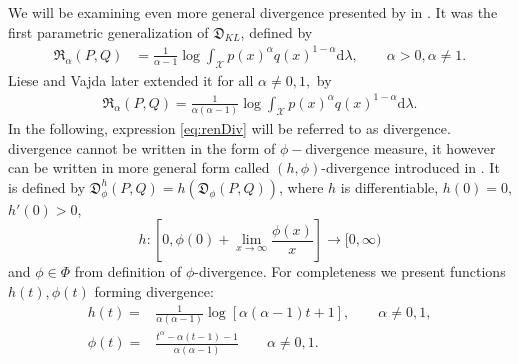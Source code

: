 We will be examining even more general divergence presented by \ren in \cite{Renyi1961}. It was the first parametric generalization of $\mathfrak{D}_{KL}$, defined by
\begin{align*}
\mathfrak{R}_\alpha(P,Q) & = \frac{1}{\alpha-1} \log\int_\mathcal{X} p(x)^\alpha q(x)^{1-\alpha}\mathrm{d}\lambda , \qquad \alpha >0, \alpha \neq 1.
\end{align*}
Liese and Vajda \cite{LieseVajda1987} later extended it for all $\alpha \neq 0,1,$ by
\begin{equation}
\begin{aligned}
\mathfrak{R}_\alpha(P,Q)  = \frac{1}{\alpha(\alpha-1)} \log\int_\mathcal{X} p(x)^\alpha q(x)^{1-\alpha}\mathrm{d}\lambda.%
\label{eq:renDiv}
\end{aligned}
\end{equation}
In the following, expression \eqref{eq:renDiv} will be referred to as \ren divergence.
\ren divergence cannot be written in the form of $\phi-$divergence measure, it however can be written in more general form called $(h,\phi)$-divergence introduced  in \cite{Menendez1995}. It is defined by  $\mathfrak{D}_\phi^h(P,Q) = h( \mathfrak{D}_{\phi}(P,Q))$, where  $h$ is differentiable, $h(0) = 0$, $h' (0) > 0 $,  \[h : \left[0,\phi(0) + \lim_{x\rightarrow \infty} \frac{\phi(x)}{x} \right] \rightarrow [0,\infty)\] and $\phi \in \Phi$ from definition of $\phi$-divergence. For completeness we present functions $h(t), \phi(t)$ forming \ren divergence:
\begin{align*}
h(t) = & \frac{1}{\alpha(\alpha-1)} \log\left[ \alpha(\alpha - 1)t + 1\right], \qquad \alpha \neq 0,1, \\
\phi(t) = & \frac{t^\alpha - \alpha(t-1) -1}{\alpha(\alpha -1)} \qquad \alpha \neq 0,1.
\end{align*}
